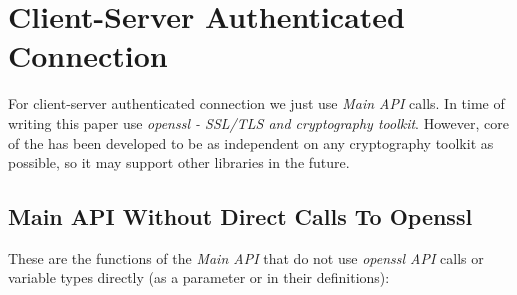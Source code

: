 %
%

\section{Client-Server Authenticated Connection}
\label{s:cs-auth-conn}

For client-server authenticated connection we just use \CANL
\textit{Main API} calls. In time of writing this paper 
\CANL use \textit{openssl - SSL/TLS and cryptography toolkit}. 
However, core of the \CANL has been developed to be as independent
 on any cryptography toolkit as possible, so it may support 
other libraries in the future.

\subsection{Main API Without Direct Calls To Openssl}
These are the functions of the \textit{Main API} that do not 
use \textit{openssl API} calls or variable types directly
 (as a parameter or in their definitions):

